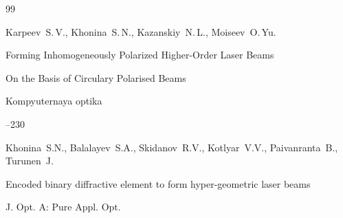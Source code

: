 \begin{thebibliography}{99}
\misctransl

\by Karpeev~S.\,V., Khonina~S.\,N., Kazanskiy~N.\,L., Moiseev~O.\,Yu.

\paper Forming Inhomogeneously Polarized Higher-Order Laser Beams

On the Basis of Circulary Polarised Beams

\jour Kompyuternaya optika

   --230






\by Khonina~S.N., Balalayev~S.A., Skidanov~R.V., Kotlyar~V.V., Paivanranta~B., Turunen~J.

\paper Encoded binary diffractive element to form hyper-geometric laser beams

\jour J. Opt. A: Pure Appl. Opt.









\end{thebibliography}







\noindent

\hskip6.5cm \thedate \par\noindent

\hskip6.5cm\therevdate





\vspace{-10mm}



%


%





\makeengtitle







\newpage

%


%

%

